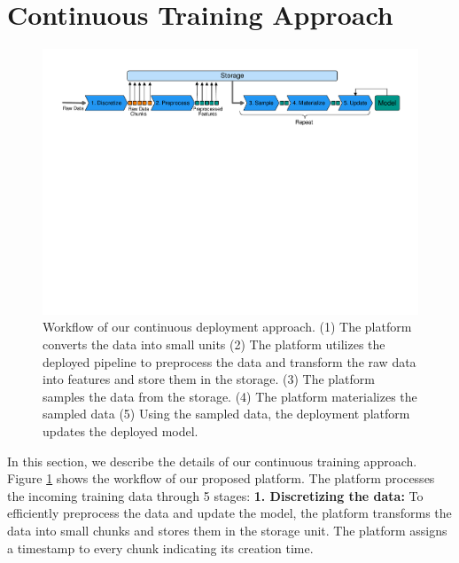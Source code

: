 \section{Continuous Training Approach} \label{continuous-training-serving}
\begin{figure}[t]
\centering
\includegraphics[width=\textwidth]{../images/continuous-training-details.pdf}
 \vspace{-20pt}
\caption{Workflow of our continuous deployment approach. (1) The platform converts the data into small units (2) The platform utilizes the deployed pipeline to preprocess the data and transform the raw data into features and store them in the storage. (3) The platform samples the data from the storage. (4) The platform materializes the sampled data (5) Using the sampled data, the deployment platform updates the deployed model.}
 \vspace{-13pt}
\label{fig:continuous-deployment-details}
\end{figure}
In this section, we describe the details of our continuous training approach.
Figure \ref{fig:continuous-deployment-details} shows the workflow of our proposed platform.
The platform processes the incoming training data through 5 stages:\newline
\textbf{1. Discretizing the data: } 
To efficiently preprocess the data and update the model, the platform transforms the data into small chunks and stores them in the storage unit. 
The platform assigns a timestamp to every chunk indicating its creation time.
